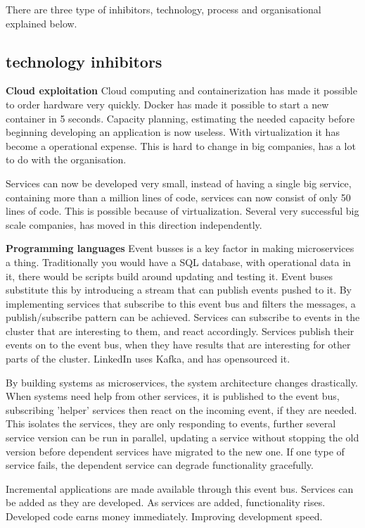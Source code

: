 There are three type of inhibitors, technology, process and organisational explained below.

\subsection{technology inhibitors}
\textbf{Cloud exploitation}
Cloud computing and containerization has made it possible to order hardware very quickly. Docker has made it possible to start a new container in 5 seconds. Capacity planning, estimating the needed capacity before beginning developing an application is now useless. With virtualization it has become a operational expense. This is hard to change in big companies, has a lot to do with the organisation.

Services can now be developed very small, instead of having a single big service, containing more than a million lines of code, services can now consist of only 50 lines of code. This is possible because of virtualization. Several very successful big scale companies, has moved in this direction independently.


\textbf{Programming languages}
Event busses is a key factor in making microservices a thing. Traditionally you would have a SQL database, with operational data in it, there would be scripts build around updating and testing it.
Event buses substitute this by introducing a stream that can publish events pushed to it. By implementing services that subscribe to this event bus and filters the messages, a publish/subscribe pattern can be achieved. Services can subscribe to events in the cluster that are interesting to them, and react accordingly. Services publish their events on to the event bus, when they have results that are interesting for other parts of the cluster.
LinkedIn uses Kafka, and has opensourced it.

By building systems as microservices, the system architecture changes drastically. When systems need help from other services, it is published to the event bus, subscribing 'helper' services then react on the incoming event, if they are needed. This isolates the services, they are only responding to events, further several service version can be run in parallel, updating a service without stopping the old version before dependent services have migrated to the new one. If one type of service fails, the dependent service can degrade functionality gracefully.

Incremental applications are made available through this event bus. Services can be added as they are developed. As services are added, functionality rises. Developed code earns money immediately. Improving development speed.

